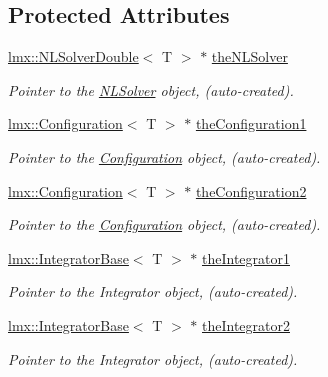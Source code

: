 \subsection*{Protected Attributes}
\begin{DoxyCompactItemize}
\item 
\hyperlink{classlmx_1_1NLSolverDouble}{lmx\-::\-N\-L\-Solver\-Double}$<$ T $>$ $\ast$ \hyperlink{classlmx_1_1DiffProblemDouble_aec50fd5565c52bcb97854648d8b7090b}{the\-N\-L\-Solver}
\begin{DoxyCompactList}\small\item\em Pointer to the \hyperlink{classlmx_1_1NLSolver}{N\-L\-Solver} object, (auto-\/created). \end{DoxyCompactList}\item 
\hyperlink{classlmx_1_1Configuration}{lmx\-::\-Configuration}$<$ T $>$ $\ast$ \hyperlink{classlmx_1_1DiffProblemDouble_ae53777e808b169b5d9974e4e1b5ae88c}{the\-Configuration1}
\begin{DoxyCompactList}\small\item\em Pointer to the \hyperlink{classlmx_1_1Configuration}{Configuration} object, (auto-\/created). \end{DoxyCompactList}\item 
\hyperlink{classlmx_1_1Configuration}{lmx\-::\-Configuration}$<$ T $>$ $\ast$ \hyperlink{classlmx_1_1DiffProblemDouble_ac19d79f3e7b88a12467a7822e33ca7ab}{the\-Configuration2}
\begin{DoxyCompactList}\small\item\em Pointer to the \hyperlink{classlmx_1_1Configuration}{Configuration} object, (auto-\/created). \end{DoxyCompactList}\item 
\hyperlink{classlmx_1_1IntegratorBase}{lmx\-::\-Integrator\-Base}$<$ T $>$ $\ast$ \hyperlink{classlmx_1_1DiffProblemDouble_ab280b17787513f600649850f9a343aa6}{the\-Integrator1}
\begin{DoxyCompactList}\small\item\em Pointer to the Integrator object, (auto-\/created). \end{DoxyCompactList}\item 
\hyperlink{classlmx_1_1IntegratorBase}{lmx\-::\-Integrator\-Base}$<$ T $>$ $\ast$ \hyperlink{classlmx_1_1DiffProblemDouble_a64e25c04214254252b8750599f779b78}{the\-Integrator2}
\begin{DoxyCompactList}\small\item\em Pointer to the Integrator object, (auto-\/created). \end{DoxyCompactList}\item 

\end{DoxyCompactItemize}
